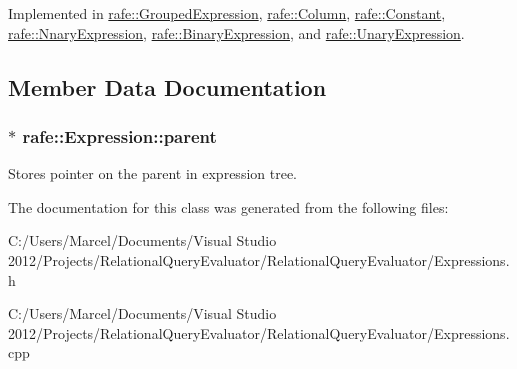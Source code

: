 Implemented in \hyperlink{classrafe_1_1_grouped_expression_ab770657757c0b374e4eacc8112ba9c4f}{rafe\+::\+Grouped\+Expression}, \hyperlink{classrafe_1_1_column_a420f51cd25221b94cbc0dcb7391ee950}{rafe\+::\+Column}, \hyperlink{classrafe_1_1_constant_a5c74a0f6230626f3e49ecaae189c7a7f}{rafe\+::\+Constant}, \hyperlink{classrafe_1_1_nnary_expression_a3e7adc7e9dc45caa0a6ac3919564a921}{rafe\+::\+Nnary\+Expression}, \hyperlink{classrafe_1_1_binary_expression_ac094c4a5686ded1827d12e14bdfae1c6}{rafe\+::\+Binary\+Expression}, and \hyperlink{classrafe_1_1_unary_expression_adef2ed922c3a5d6248469dc6e0b78842}{rafe\+::\+Unary\+Expression}.



\subsection{Member Data Documentation}
\hypertarget{classrafe_1_1_expression_ae6f0ee539cc324899c34926733fe33b1}{
\subsubsection[{parent}]{$\ast$ rafe\+::\+Expression\+::parent}}\label{classrafe_1_1_expression_ae6f0ee539cc324899c34926733fe33b1}
Stores pointer on the parent in expression tree. 

The documentation for this class was generated from the following files\+:\begin{DoxyCompactItemize}
\item 
C\+:/\+Users/\+Marcel/\+Documents/\+Visual Studio 2012/\+Projects/\+Relational\+Query\+Evaluator/\+Relational\+Query\+Evaluator/Expressions.\+h\item 
C\+:/\+Users/\+Marcel/\+Documents/\+Visual Studio 2012/\+Projects/\+Relational\+Query\+Evaluator/\+Relational\+Query\+Evaluator/Expressions.\+cpp\end{DoxyCompactItemize}
